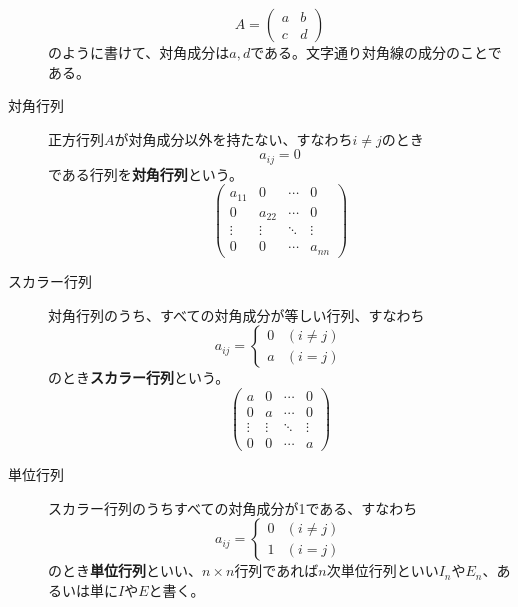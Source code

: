 \documentclass[10pt]{jsarticle}
\theoremstyle{definition}%
\numberwithin{equation}{section}%
\begin{document}
\begin{framed}
\begin{description}
\begin{equation}
  A=\left( 
\begin{matrix}
  a & b \\
  c & d
\end{matrix}
  \right)  
  \end{equation}
  のように書けて、対角成分は$a,d$である。文字通り対角線の成分のことである。
  \item[対角行列] 正方行列$A$が対角成分以外を持たない、すなわち$i\neq j$のとき
  \begin{equation}
  a_{ij}=0  
  \end{equation}
  である行列を{\bf 対角行列}という。
  \begin{equation}
    \left( \begin{matrix}
      a_{11} & 0 & \cdots & 0 \\
      0 & a_{22} & \cdots & 0 \\
      \vdots  & \vdots  & \ddots & \vdots \\
      0& 0 & \cdots & a_{nn}
    \end{matrix} \right)
  \end{equation}
  \item[スカラー行列] 対角行列のうち、すべての対角成分が等しい行列、すなわち
\begin{equation}
  a_{ij} =\begin{cases}
    0 & (i\neq j)\\
    a& (i=j)
  \end{cases}
\end{equation}
  のとき{\bf スカラー行列}という。
  \begin{equation}
    \left( \begin{matrix}
      a & 0 & \cdots & 0 \\
      0 & a & \cdots & 0 \\
      \vdots  & \vdots  & \ddots & \vdots \\
      0& 0 & \cdots & a
    \end{matrix} \right)
  \end{equation}
  \item[単位行列] スカラー行列のうちすべての対角成分が1である、すなわち
  \begin{equation}
    a_{ij}=\begin{cases}
      0 & (i\neq j)\\
      1& (i=j)
    \end{cases}
  \end{equation}
  のとき{\bf 単位行列}といい、$n\times n$行列であれば$n$次単位行列といい$I_{n}$や$E_{n}$、あるいは単に$I$や$E$と書く。

\end{description}
\end{framed}
\end{document}
